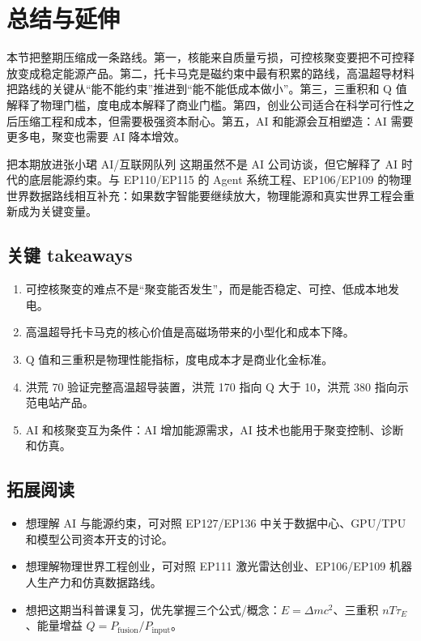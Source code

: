 \section{总结与延伸}

本节把整期压缩成一条路线。第一，核能来自质量亏损，可控核聚变要把不可控释放变成稳定能源产品。第二，托卡马克是磁约束中最有积累的路线，高温超导材料把路线的关键从“能不能约束”推进到“能不能低成本做小”。第三，三重积和 Q 值解释了物理门槛，度电成本解释了商业门槛。第四，创业公司适合在科学可行性之后压缩工程和成本，但需要极强资本耐心。第五，AI 和能源会互相塑造：AI 需要更多电，聚变也需要 AI 降本增效。

\begin{importantbox}{把本期放进张小珺 AI/互联网队列}
这期虽然不是 AI 公司访谈，但它解释了 AI 时代的底层能源约束。与 EP110/EP115 的 Agent 系统工程、EP106/EP109 的物理世界数据路线相互补充：如果数字智能要继续放大，物理能源和真实世界工程会重新成为关键变量。
\end{importantbox}

\subsection{关键 takeaways}

\begin{enumerate}
\item 可控核聚变的难点不是“聚变能否发生”，而是能否稳定、可控、低成本地发电。
\item 高温超导托卡马克的核心价值是高磁场带来的小型化和成本下降。
\item Q 值和三重积是物理性能指标，度电成本才是商业化金标准。
\item 洪荒 70 验证完整高温超导装置，洪荒 170 指向 Q 大于 10，洪荒 380 指向示范电站产品。
\item AI 和核聚变互为条件：AI 增加能源需求，AI 技术也能用于聚变控制、诊断和仿真。
\end{enumerate}

\subsection{拓展阅读}

\begin{itemize}
\item 想理解 AI 与能源约束，可对照 EP127/EP136 中关于数据中心、GPU/TPU 和模型公司资本开支的讨论。
\item 想理解物理世界工程创业，可对照 EP111 激光雷达创业、EP106/EP109 机器人生产力和仿真数据路线。
\item 想把这期当科普课复习，优先掌握三个公式/概念：$E=\Delta mc^2$、三重积 $nT\tau_E$、能量增益 $Q=P_{\mathrm{fusion}}/P_{\mathrm{input}}$。
\end{itemize}


